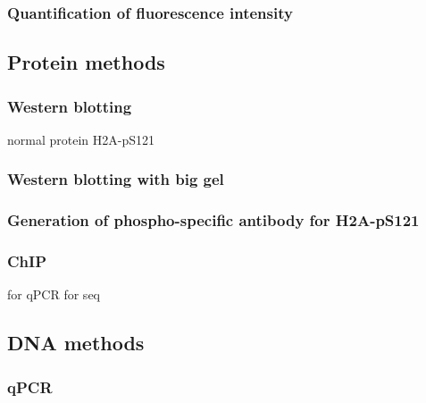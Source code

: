 \subsubsection{Quantification of fluorescence intensity}


\subsection{Protein methods}
\subsubsection{Western blotting}
normal protein
H2A-pS121
\subsubsection{Western blotting with big gel}
\subsubsection{Generation of phospho-specific antibody for H2A-pS121}
\subsubsection{ChIP}
for qPCR
for seq
\subsection{DNA methods}
\subsubsection{qPCR}

